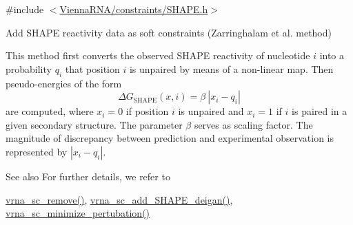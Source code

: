 {\ttfamily \#include $<$\hyperlink{SHAPE_8h}{Vienna\+R\+N\+A/constraints/\+S\+H\+A\+P\+E.\+h}$>$}



Add S\+H\+A\+PE reactivity data as soft constraints (Zarringhalam et al. method) 

This method first converts the observed S\+H\+A\+PE reactivity of nucleotide $ i $ into a probability $ q_i $ that position $ i $ is unpaired by means of a non-\/linear map. Then pseudo-\/energies of the form \[ \Delta G_{\text{SHAPE}}(x,i) = \beta\ |x_i - q_i| \] are computed, where $ x_i=0 $ if position $ i $ is unpaired and $ x_i=1 $ if $ i $ is paired in a given secondary structure. The parameter $ \beta $ serves as scaling factor. The magnitude of discrepancy between prediction and experimental observation is represented by $ |x_i - q_i| $.

\begin{DoxySeeAlso}{See also}
For further details, we refer to \cite{zarringhalam:2012} 

\hyperlink{group__soft__constraints_ga73cdc07b9a199c614367bebef0f2c41a}{vrna\+\_\+sc\+\_\+remove()}, \hyperlink{group__SHAPE__reactivities_ga57d612b58e1c61dd6cfcb5a843f8f1b3}{vrna\+\_\+sc\+\_\+add\+\_\+\+S\+H\+A\+P\+E\+\_\+deigan()}, \hyperlink{group__perturbation_gaa124bdc20d88001c38ade590c4bcc3c4}{vrna\+\_\+sc\+\_\+minimize\+\_\+pertubation()}
\end{DoxySeeAlso}

